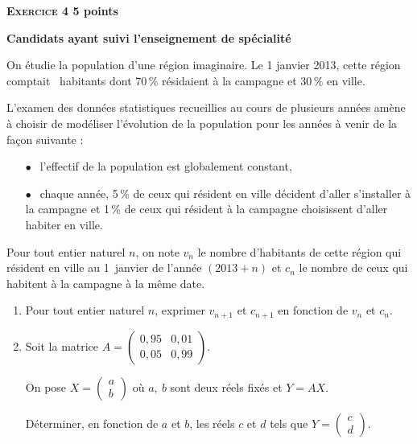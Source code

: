 \documentclass[10pt]{article}
\begin{document}
\vspace{0,5cm}

\textbf{\textsc{Exercice 4} \hfill 5 points}
 
\textbf{Candidats ayant  suivi l'enseignement de spécialité }

\medskip

On étudie la population d'une région imaginaire. Le 1 janvier 2013, cette région comptait ~habitants dont 70\,\% résidaient à la campagne et 30\,\% en ville.
 
L'examen des données statistiques recueillies au cours de plusieurs années amène à choisir de modéliser l'évolution de la population pour les années à venir de la façon suivante : 

\setlength\parindent{8mm}
\begin{itemize}
\item[$\bullet~~$] l'effectif de la population est globalement constant,
\item[$\bullet~~$] chaque année, 5\,\% de ceux qui résident en ville décident d'aller s'installer à la campagne et 1\,\% de ceux qui résident à la campagne choisissent d'aller habiter en ville.
\end{itemize}
\setlength\parindent{0mm}

\bigskip
 
Pour tout entier naturel $n$, on note $v_{n}$ le nombre d'habitants de cette région qui résident en ville au 1~janvier de l'année $(2013 + n)$ et $c_{n}$ le nombre de ceux qui habitent à la campagne à la même date.

\medskip
 
\begin{enumerate}
\item Pour tout entier naturel $n$, exprimer $v_{n+1}$ et $c_{n+1}$ en fonction de $v_{n}$ et $c_{n}$.  
\item Soit la matrice $A = \begin{pmatrix}0,95&0,01\\0,05& 0,99\end{pmatrix}$. 

On pose $X = \begin{pmatrix}a\\b\end{pmatrix}$ où $a,\: b$ sont deux réels fixés et $Y = AX$.
 
Déterminer, en fonction de $a$ et $b$, les réels $c$ et $d$ tels que $Y = \begin{pmatrix}c\\d\end{pmatrix}$.
\end{enumerate}
 
\end{document}
